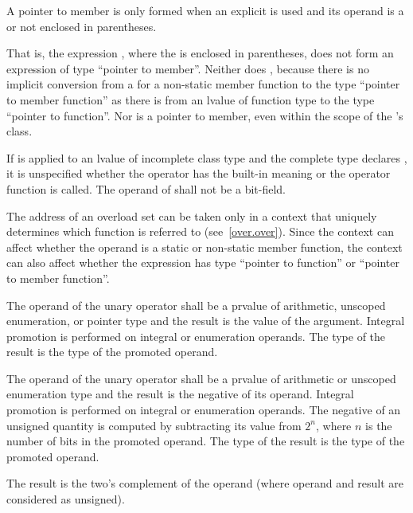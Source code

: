 \pnum
A pointer to member is only formed when an explicit \tcode{\&} is used
and its operand is
a  or 
not enclosed in parentheses.
\begin{note}
That is, the expression , where the
 is enclosed in parentheses, does not form an
expression of type ``pointer to member''. Neither does
, because there is no implicit conversion from a
 for a non-static member function to the type
``pointer to member function'' as there is from an lvalue of function
type to the type ``pointer to function''. Nor is
 a pointer to member, even within the scope of
the 's class.
\end{note}

\pnum
If \tcode{\&} is applied to an lvalue of incomplete class type and the
complete type declares , it is unspecified whether
the operator has the built-in meaning or the operator function is
called. The operand of \tcode{\&} shall not be a bit-field.

\pnum
{}%
\begin{note}
The address of an overload set can be taken
only in a context that uniquely determines
which function is referred to (see~\ref{over.over}).
Since the context can affect whether the operand is a static or
non-static member function, the context can also affect whether the
expression has type ``pointer to function'' or ``pointer to member
function''.
\end{note}

\pnum
{}%
The operand of the unary \tcode{+} operator shall be a prvalue of
arithmetic, unscoped
enumeration, or pointer type and the result is the value of the
argument. Integral promotion is performed on integral or enumeration
operands. The type of the result is the type of the promoted operand.

\pnum
{}%
The operand of the unary \tcode{-} operator shall be a prvalue of
arithmetic or unscoped
enumeration type and the result is the negative of its operand. Integral
promotion is performed on integral or enumeration operands. The negative
of an unsigned quantity is computed by subtracting its value from $2^n$,
where $n$ is the number of bits in the promoted operand. The type of the
result is the type of the promoted operand.
\begin{note}
The result is the two's complement of the operand
(where operand and result are considered as unsigned).
\end{note}

